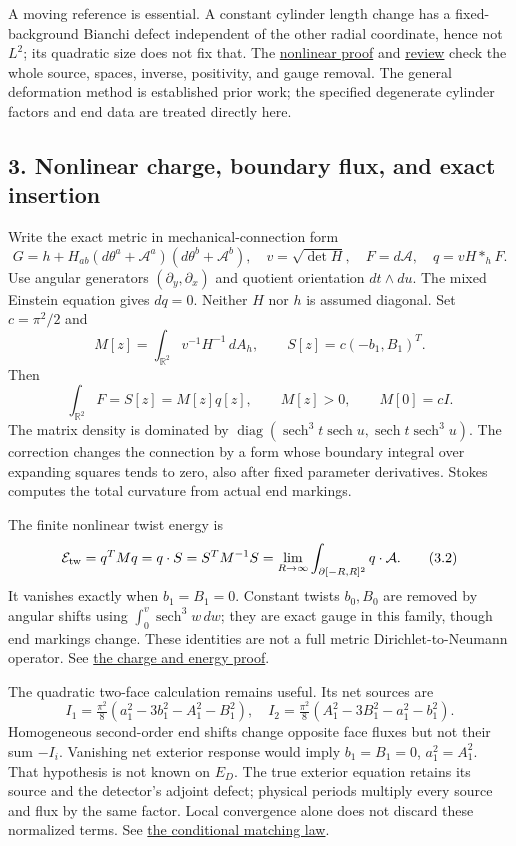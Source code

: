 \documentclass[
  english,
]{article}
\begin{document}
A moving reference is essential. A constant cylinder length change has a
fixed-background Bianchi defect independent of the other radial
coordinate, hence not \(L^2\); its quadratic size does not fix that. The
\href{../proofs/round3_construction.md}{nonlinear proof} and
\href{../proofs/round3_construction_review.md}{review} check the whole
source, spaces, inverse, positivity, and gauge removal. The general
deformation method is established prior work; the specified degenerate
cylinder factors and end data are treated directly here.

\hypertarget{nonlinear-charge-boundary-flux-and-exact-insertion}{%
\subsection{3. Nonlinear charge, boundary flux, and exact
insertion}\label{nonlinear-charge-boundary-flux-and-exact-insertion}}

Write the exact metric in mechanical-connection form \[
G=h+H_{ab}(d\theta^a+\mathcal A^a)(d\theta^b+\mathcal A^b),\quad
v=\sqrt{\det H},\quad F=d\mathcal A,\quad q=vH*_hF.
\] Use angular generators \((\partial_y,\partial_x)\) and quotient
orientation \(dt\wedge du\). The mixed Einstein equation gives \(dq=0\).
Neither \(H\) nor \(h\) is assumed diagonal. Set \(c=\pi^2/2\) and \[
M[z]=\int_{\mathbb R^2}v^{-1}H^{-1}\,dA_h,\qquad
S[z]=c(-b_1,B_1)^T.
\] Then \[
\int_{\mathbb R^2}F=S[z]=M[z]q[z],\qquad M[z]>0,\qquad M[0]=cI.
\tag{3.1}
\] The matrix density is dominated by
\(\operatorname{diag}(\operatorname{sech}^3t\operatorname{sech}u, \operatorname{sech}t\operatorname{sech}^3u)\).
The correction changes the connection by a form whose boundary integral
over expanding squares tends to zero, also after fixed parameter
derivatives. Stokes computes the total curvature from actual end
markings.

The finite nonlinear twist energy is \[
\mathcal E_{\rm tw}=q^TMq=q\cdot S=S^TM^{-1}S
=\lim_{R\to\infty}\int_{\partial[-R,R]^2}q\cdot\mathcal A.
\tag{3.2}
\] It vanishes exactly when \(b_1=B_1=0\). Constant twists \(b_0,B_0\)
are removed by angular shifts using
\(\int_0^v\operatorname{sech}^3w\,dw\); they are exact gauge in this
family, though end markings change. These identities are not a full
metric Dirichlet-to-Neumann operator. See
\href{../proofs/round4_construction.md}{the charge and energy proof}.

The quadratic two-face calculation remains useful. Its net sources are
\[
I_1=\tfrac{\pi^2}{8}(a_1^2-3b_1^2-A_1^2-B_1^2),\quad
I_2=\tfrac{\pi^2}{8}(A_1^2-3B_1^2-a_1^2-b_1^2).
\] Homogeneous second-order end shifts change opposite face fluxes but
not their sum \(-I_i\). Vanishing net exterior response would imply
\(b_1=B_1=0\), \(a_1^2=A_1^2\). That hypothesis is not known on \(E_D\).
The true exterior equation retains its source and the detector's adjoint
defect; physical periods multiply every source and flux by the same
factor. Local convergence alone does not discard these normalized terms.
See \href{../proofs/round3_matching_next.md}{the conditional matching
law}.
\end{document}

